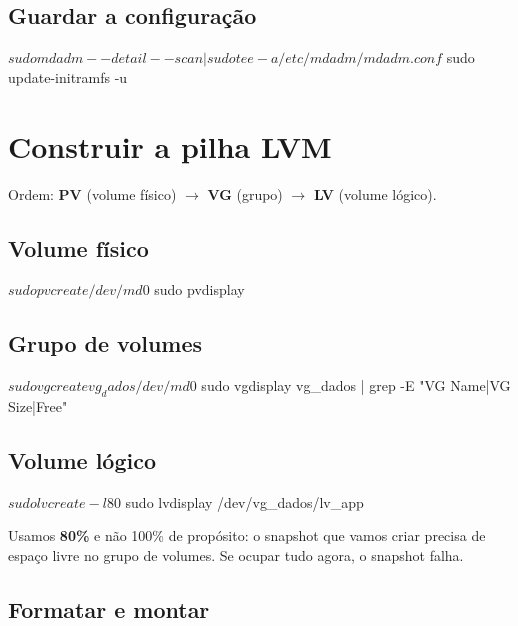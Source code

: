 \documentclass[11pt,a4paper]{article}
\begin{document}
\subsection{Guardar a configuração}

\begin{terminal}
$ sudo mdadm --detail --scan | sudo tee -a /etc/mdadm/mdadm.conf
$ sudo update-initramfs -u
\end{terminal}

\section{Construir a pilha LVM}

Ordem: \textbf{PV} (volume físico) $\rightarrow$ \textbf{VG} (grupo) $\rightarrow$ \textbf{LV} (volume lógico).

\subsection{Volume físico}

\begin{terminal}
$ sudo pvcreate /dev/md0
$ sudo pvdisplay
\end{terminal}

\subsection{Grupo de volumes}

\begin{terminal}
$ sudo vgcreate vg_dados /dev/md0
$ sudo vgdisplay vg_dados | grep -E "VG Name|VG Size|Free"
\end{terminal}

\subsection{Volume lógico}

\begin{terminal}
$ sudo lvcreate -l 80%
$ sudo lvdisplay /dev/vg_dados/lv_app
\end{terminal}

\begin{atencao}
Usamos \textbf{80\%} e não 100\% de propósito: o snapshot que vamos criar precisa de espaço livre no grupo de volumes. Se ocupar tudo agora, o snapshot falha.
\end{atencao}

\subsection{Formatar e montar}
\end{document}
